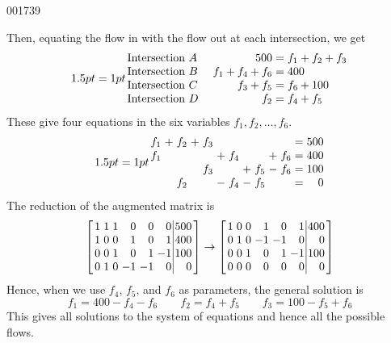 \begin{example}{}{001739}
\begin{solution}
Then, equating the flow in with the flow out at each intersection, we get
\begin{equation*}
\arraycolsep=1pt
\begin{array}{lrl}
	\mbox{Intersection } A & 500 					& = f_1 + f_2 + f_3 \\
	\mbox{Intersection } B & \quad f_1 + f_4 + f_6 	& = 400 \\
	\mbox{Intersection } C & f_3 + f_5 				& = f_6 + 100 \\
	\mbox{Intersection } D & f_2					& = f_4 + f_5 \\
\end{array}
\end{equation*}
These give four equations in the six variables $ f_1, f_2, \dots , f_6 $.
\begin{equation*}
\arraycolsep=1pt
\begin{array}{rlrlrlrlrlrcr}
	f_1 & + & f_2 & + & f_3 &   &     &   &     &   &     & = & 500 \\
	f_1 &   &     &   &     & + & f_4 &   &     & + & f_6 & = & 400 \\
	    &   &     &   & f_3 &   &     & + & f_5 & - & f_6 & = & 100 \\
	    &   & f_2 &   &     & - & f_4 & - & f_5 &   &     & = & 0 \\
\end{array}
\end{equation*}
The reduction of the augmented matrix is
\begin{equation*}
\leftB \begin{array}{rrrrrr|r}
	1 & 1 & 1 & 0 & 0 & 0 & 500 \\
	1 & 0 & 0 & 1 & 0 & 1 & 400 \\
	0 & 0 & 1 & 0 & 1 &-1 & 100 \\
	0 & 1 & 0 &-1 &-1 & 0 & 0
\end{array} \rightB
\rightarrow
\leftB \begin{array}{rrrrrr|r}
	1 & 0 & 0 & 1 & 0 & 1 & 400 \\
	0 & 1 & 0 &-1 &-1 & 0 & 0 \\
	0 & 0 & 1 & 0 & 1 &-1 & 100 \\
	0 & 0 & 0 & 0 & 0 & 0 & 0
\end{array} \rightB
\end{equation*}
Hence, when we use $f_4$, $f_5$, and $f_6$ as parameters, the general solution is
\begin{equation*}
f_1 = 400 - f_4 - f_6 \quad\quad f_2 = f_4 + f_5 \quad\quad f_3 = 100 - f_5 + f_6
\end{equation*}
This gives all solutions to the system of equations and hence all the possible flows.


\end{solution}
\end{example}
